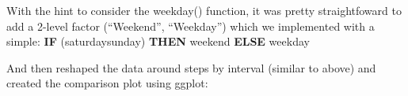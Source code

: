 \documentclass[]{article}
\newenvironment{Shaded}{\begin{snugshade}}{\end{snugshade}}
\newcommand{\KeywordTok}[1]{\textcolor[rgb]{0.13,0.29,0.53}{\textbf{#1}}}
\newcommand{\NormalTok}[1]{#1}
\newcommand{\OperatorTok}[1]{\textcolor[rgb]{0.81,0.36,0.00}{\textbf{#1}}}
\newcommand{\StringTok}[1]{\textcolor[rgb]{0.31,0.60,0.02}{#1}}
\begin{document}
With the hint to consider the weekday() function, it was pretty
straightfoward to add a 2-level factor (``Weekend'', ``Weekday'') which
we implemented with a simple: \textbf{IF} (saturday\textbar{}sunday)
\textbf{THEN} weekend \textbf{ELSE} weekday

\begin{Shaded}
\end{Shaded}

And then reshaped the data around steps by interval (similar to above)
and created the comparison plot using ggplot:
\end{document}
